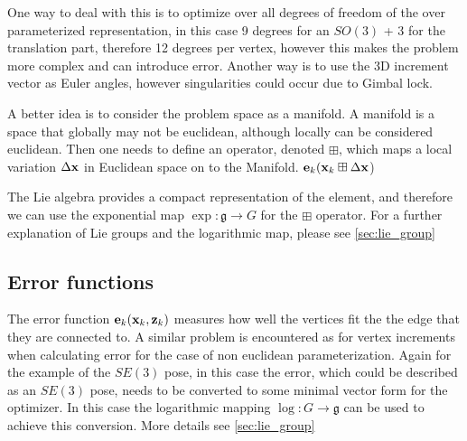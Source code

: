 One way to deal with this is to optimize over all degrees of freedom of the over parameterized representation, in this case 9 degrees for an $SO(3)$ + 3 for the translation part, therefore 12 degrees per vertex, however this makes the problem more complex and can introduce error.  Another way is to use the 3D increment vector as Euler angles, however singularities could occur due to Gimbal lock.

A better idea is to consider the problem space as a manifold.  A manifold is a space that globally may not be euclidean, although locally can be considered euclidean.  Then one needs to define an operator, denoted $\boxplus$, which maps a local variation $\Delta\mathbf x$ in Euclidean space on to the Manifold. $\mathbf e_k(\mathbf x_k \boxplus \Delta\mathbf x$)

The Lie algebra provides a compact representation of the element, and therefore we can use the exponential map $\exp\colon \mathfrak g \to G$ for the $\boxplus$ operator.  For a further explanation of Lie groups and the logarithmic map, please see \ref{sec:lie_group}

\subsection{Error functions}
\label{sec:error_function}
The error function $\mathbf e_k(\mathbf x_k, \mathbf z_k)$ measures how well the vertices fit the the edge that they are connected to.  A similar problem is encountered as for vertex increments when calculating error for the case of non euclidean parameterization.  Again for the example of the $SE(3)$ pose, in this case the error, which could be described as an $SE(3)$ pose, needs to be converted to some minimal vector form for the optimizer.  In this case the  logarithmic mapping $\log\colon G \to \mathfrak g$ can be used to achieve this conversion. More details see \ref{sec:lie_group}

